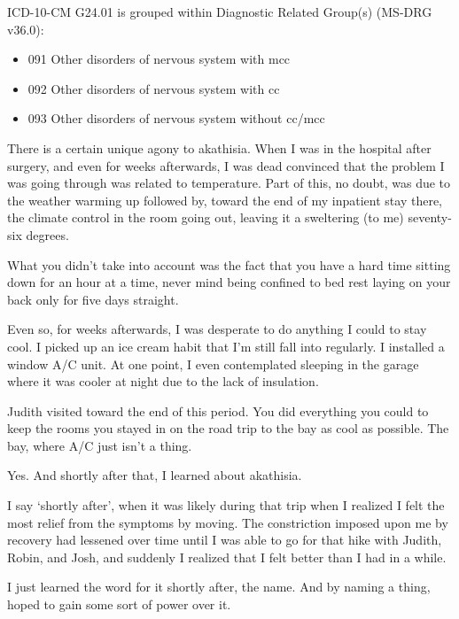 \begin{paracol}{2}
\begin{leftcolumn}
\noindent ICD-10-CM G24.01 is grouped within Diagnostic Related Group(s) (MS-DRG v36.0):

\begin{itemize}
\tightlist
\item
  091 Other disorders of nervous system with mcc
\item
  092 Other disorders of nervous system with cc
\item
  093 Other disorders of nervous system without cc/mcc
\end{itemize}
\newpage

\noindent There is a certain unique agony to akathisia. When I was in the hospital after surgery, and even for weeks afterwards, I was dead convinced that the problem I was going through was related to temperature. Part of this, no doubt, was due to the weather warming up followed by, toward the end of my inpatient stay there, the climate control in the room going out, leaving it a sweltering (to me) seventy-six degrees.

\begin{ally}
What you didn't take into account was the fact that you have a hard time sitting down for an hour at a time, never mind being confined to bed rest laying on your back only for five days straight.
\end{ally}
Even so, for weeks afterwards, I was desperate to do anything I could to stay cool. I picked up an ice cream habit that I'm still fall into regularly. I installed a window A/C unit. At one point, I even contemplated sleeping in the garage where it was cooler at night due to the lack of insulation.

\begin{ally}
Judith visited toward the end of this period. You did everything you could to keep the rooms you stayed in on the road trip to the bay as cool as possible. The bay, where A/C just isn't a thing.
\end{ally}
Yes. And shortly after that, I learned about akathisia.

I say `shortly after', when it was likely during that trip when I realized I felt the most relief from the symptoms by moving. The constriction imposed upon me by recovery had lessened over time until I was able to go for that hike with Judith, Robin, and Josh, and suddenly I realized that I felt better than I had in a while.

I just learned the word for it shortly after, the name. And by naming a thing, hoped to gain some sort of power over it.


\end{leftcolumn}
\end{paracol}
